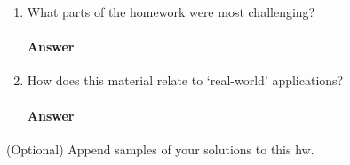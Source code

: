 \documentclass{article}
\begin{document}
\begin{enumerate}
    \item What parts of the homework were most challenging?

        \paragraph{Answer}

    \item How does this material relate to `real-world' applications?

        \paragraph{Answer}
\end{enumerate}

(Optional)
Append samples of your solutions to this hw.
\end{document}
